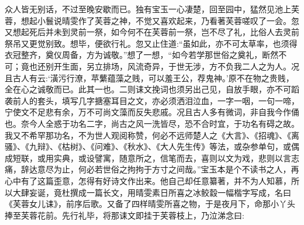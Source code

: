 \begin{parag}
    众人皆无别话，不过至晚安歇而已。独有宝玉一心凄楚，回至园中，猛然见池上芙蓉，想起小鬟说晴雯作了芙蓉之神，不觉又喜欢起来，乃看著芙蓉嗟叹了一会。忽又想起死后并未到灵前一祭，如今何不在芙蓉前一祭，岂不尽了礼，比俗人去灵前祭吊又更觉别致。想毕，便欲行礼。忽又止住道:“虽如此，亦不可太草率，也须得衣冠整齐，奠仪周备，方为诚敬。”想了一想，“如今若学那世俗之奠礼，断然不可；竟也还别开生面，另立排场，风流奇异，于世无涉，方不负我二人之为人。况且古人有云:‘潢污行潦，苹蘩蕴藻之贱，可以羞王公，荐鬼神。’原不在物之贵贱，全在心之诚敬而已。此其一也。二则诔文挽词也须另出己见，自放手眼，亦不可蹈袭前人的套头，填写几字搪塞耳目之文，亦必须洒泪泣血，一字一咽，一句一啼，宁使文不足悲有余，万不可尚文藻而反失悲戚。况且古人多有微词，非自我今作俑也。奈今人全惑于功名二字，尚古之风一洗皆尽，恐不合时宜，于功名有碍之故。我又不希罕那功名，不为世人观阅称赞，何必不远师楚人之《大言》、《招魂》、《离骚》、《九辩》、《枯树》、《问难》、《秋水》、《大人先生传》等法，或杂参单句，或偶成短联，或用实典，或设譬寓，随意所之，信笔而去，喜则以文为戏，悲则以言志痛，辞达意尽为止，何必若世俗之拘拘于方寸之间哉。”宝玉本是个不读书之人，再心中有了这篇歪意，怎得有好诗文作出来。他自己却任意纂著，并不为人知慕，所以大肆妄诞，竟杜撰成一篇长文，用晴雯素日所喜之冰鲛縠一幅楷字写成，名曰《芙蓉女儿诔》，前序后歌。又备了四样晴雯所喜之物，于是夜月下，命那小丫头捧至芙蓉花前。先行礼毕，将那诔文即挂于芙蓉枝上，乃泣涕念曰:
\end{parag}


